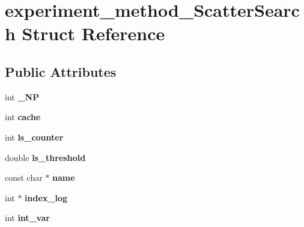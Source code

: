 \hypertarget{structexperiment__method__ScatterSearch}{\section{experiment\-\_\-method\-\_\-\-Scatter\-Search Struct Reference}
\label{structexperiment__method__ScatterSearch}
}
\subsection*{Public Attributes}
\begin{DoxyCompactItemize}
\item 
\hypertarget{structexperiment__method__ScatterSearch_a6fb7a4ec5883e32312dc8a38a2bf74be}{int {\bfseries \-\_\-\-N\-P}}\label{structexperiment__method__ScatterSearch_a6fb7a4ec5883e32312dc8a38a2bf74be}

\item 
\hypertarget{structexperiment__method__ScatterSearch_a4adb68b47e5b4c3169985e4e253f6b21}{int {\bfseries cache}}\label{structexperiment__method__ScatterSearch_a4adb68b47e5b4c3169985e4e253f6b21}

\item 
\hypertarget{structexperiment__method__ScatterSearch_a2cd7f30a6db6dcf70347fa75007706ab}{int {\bfseries ls\-\_\-counter}}\label{structexperiment__method__ScatterSearch_a2cd7f30a6db6dcf70347fa75007706ab}

\item 
\hypertarget{structexperiment__method__ScatterSearch_a7c02e615f286b068f27db5fda089e7ff}{double {\bfseries ls\-\_\-threshold}}\label{structexperiment__method__ScatterSearch_a7c02e615f286b068f27db5fda089e7ff}

\item 
\hypertarget{structexperiment__method__ScatterSearch_a8fec2920802ee4b593ad442c6a99ef83}{const char $\ast$ {\bfseries name}}\label{structexperiment__method__ScatterSearch_a8fec2920802ee4b593ad442c6a99ef83}

\item 
\hypertarget{structexperiment__method__ScatterSearch_ad3867da597e308804a939fa0824953ff}{int $\ast$ {\bfseries index\-\_\-log}}\label{structexperiment__method__ScatterSearch_ad3867da597e308804a939fa0824953ff}

\item 
\hypertarget{structexperiment__method__ScatterSearch_a9a9b323a13487d5f8e154f8f5a8d518c}{int {\bfseries int\-\_\-var}}\label{structexperiment__method__ScatterSearch_a9a9b323a13487d5f8e154f8f5a8d518c}


\end{DoxyCompactItemize}
